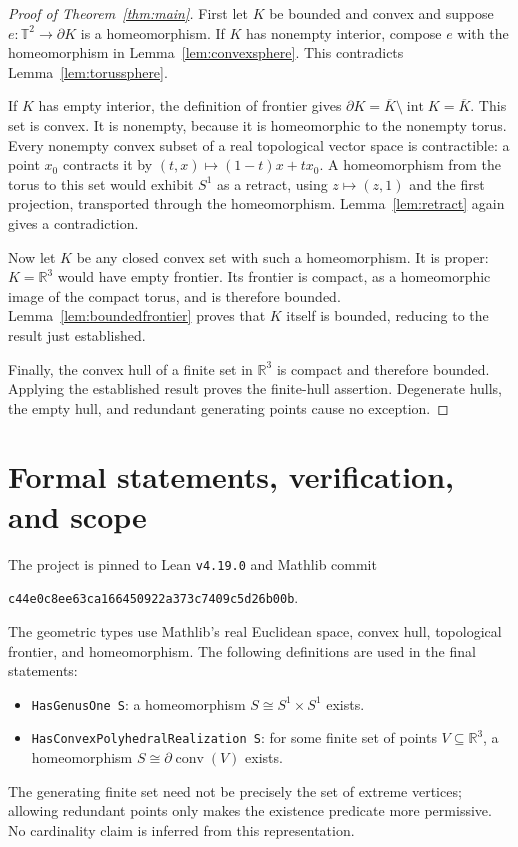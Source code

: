 \documentclass[11pt]{article}
\newcommand{\R}{\mathbb R}
\newcommand{\T}{\mathbb T}
\newcommand{\bd}{\partial}
\newcommand{\conv}{\operatorname{conv}}
\newcommand{\intr}{\operatorname{int}}
\newcommand{\code}[1]{\texttt{\small #1}}
\begin{document}
\begin{proof}[Proof of Theorem~\ref{thm:main}]
First let $K$ be bounded and convex and suppose $e:\T^2\to\bd K$ is a homeomorphism. If $K$ has nonempty interior, compose $e$ with the homeomorphism in Lemma~\ref{lem:convexsphere}. This contradicts Lemma~\ref{lem:torussphere}.

If $K$ has empty interior, the definition of frontier gives
$\bd K=\overline K\setminus\intr K=\overline K$. This set is convex. It is nonempty, because it is homeomorphic to the nonempty torus. Every nonempty convex subset of a real topological vector space is contractible: a point $x_0$ contracts it by $(t,x)\mapsto(1-t)x+tx_0$. A homeomorphism from the torus to this set would exhibit $S^1$ as a retract, using $z\mapsto(z,1)$ and the first projection, transported through the homeomorphism. Lemma~\ref{lem:retract} again gives a contradiction.

Now let $K$ be any closed convex set with such a homeomorphism. It is proper: $K=\R^3$ would have empty frontier. Its frontier is compact, as a homeomorphic image of the compact torus, and is therefore bounded. Lemma~\ref{lem:boundedfrontier} proves that $K$ itself is bounded, reducing to the result just established.

Finally, the convex hull of a finite set in $\R^3$ is compact and therefore bounded. Applying the established result proves the finite-hull assertion. Degenerate hulls, the empty hull, and redundant generating points cause no exception.
\end{proof}

\section{Formal statements, verification, and scope}
The project is pinned to Lean \code{v4.19.0} and Mathlib commit
\begin{center}
\code{c44e0c8ee63ca166450922a373c7409c5d26b00b}.
\end{center}
The geometric types use Mathlib's real Euclidean space, convex hull, topological frontier, and homeomorphism. The following definitions are used in the final statements:
\begin{itemize}
\item \code{HasGenusOne S}: a homeomorphism $S\cong S^1\times S^1$ exists.
\item \code{HasConvexPolyhedralRealization S}: for some finite set of points $V\subseteq\R^3$, a homeomorphism $S\cong\bd\conv(V)$ exists.
\end{itemize}
The generating finite set need not be precisely the set of extreme vertices; allowing redundant points only makes the existence predicate more permissive. No cardinality claim is inferred from this representation.
\end{document}
